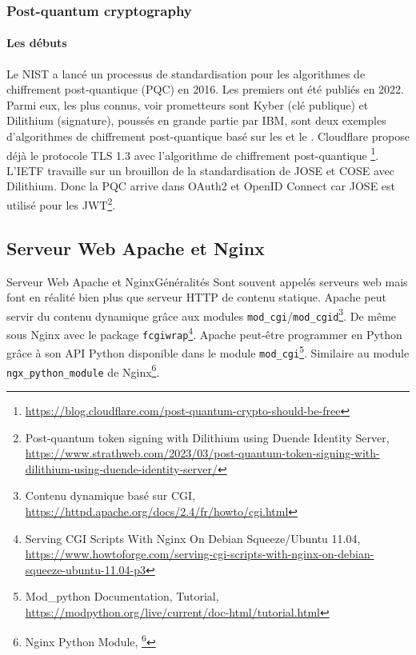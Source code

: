 \documentclass{beamer}
\begin{document}
    \begin{frame}
        \frametitle{Post-quantum cryptography}
        \framesubtitle{Les débuts}
        \begin{footnotesize}
            \transdissolve
            Le NIST a lancé un processus de standardisation pour les algorithmes de chiffrement post-quantique (PQC) en 2016.
            Les premiers ont été publiés en 2022.
            Parmi eux, les plus connus, voir prometteurs sont Kyber (clé publique) et Dilithium (signature), poussés en grande partie par IBM, sont deux exemples d'algorithmes de chiffrement post-quantique basé sur les  et le .
            \bigbreak
            Cloudflare propose déjà le protocole TLS 1.3 avec l'algorithme de chiffrement post-quantique \footnote{\url{https://blog.cloudflare.com/post-quantum-crypto-should-be-free}}.
            \bigbreak
            L'IETF travaille sur un brouillon de la standardisation de JOSE et COSE avec Dilithium.
            Donc la PQC arrive dans OAuth2 et OpenID Connect car JOSE est utilisé pour les JWT\footnote{Post-quantum token signing with Dilithium using Duende Identity Server, \url{https://www.strathweb.com/2023/03/post-quantum-token-signing-with-dilithium-using-duende-identity-server/}}.
        \end{footnotesize}
    \end{frame}

    \subsection{Serveur Web Apache et Nginx}\label{subsec:apache-nginx-web-server}
    \begin{frame}{Serveur Web Apache et Nginx}{Généralités}
        Sont souvent appelés serveurs web mais font en réalité bien plus que serveur HTTP de contenu statique.
        \bigbreak
        Apache peut servir du contenu dynamique grâce aux modules \lstinline{mod_cgi}/\lstinline{mod_cgid}\footnote{Contenu dynamique basé sur CGI, \url{https://httpd.apache.org/docs/2.4/fr/howto/cgi.html}}.
        De même sous Nginx avec le package \lstinline{fcgiwrap}\footnote{Serving CGI Scripts With Nginx On Debian Squeeze/Ubuntu 11.04, \url{https://www.howtoforge.com/serving-cgi-scripts-with-nginx-on-debian-squeeze-ubuntu-11.04-p3}}.
        \bigbreak
        Apache peut-être programmer en Python grâce à son API Python disponible dans le module \lstinline{mod_cgi}\footnote{Mod\_python Documentation, Tutorial, \url{https://modpython.org/live/current/doc-html/tutorial.html}}.
        Similaire au module \lstinline{ngx_python_module} de Nginx\footnote{Nginx Python Module, \footnote{Nginx Python Module, \url{https://github.com/arut/nginx-python-module}}}.
        \setlength\parindent{0pt}
    \end{frame}
\end{document}
